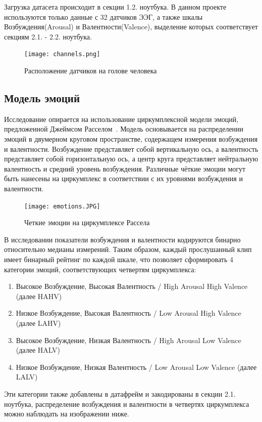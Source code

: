 \documentclass{article}
\begin{document}
Загрузка датасета происходит в секции 1.2. ноутбука. В данном проекте используются только данные с 32 датчиков ЭЭГ, а также шкалы Возбуждения(Arousal) и Валентности(Valence), выделение которых соответствует секциям 2.1. - 2.2. ноутбука.

\begin{figure}[h!]
\centering
\texttt{[image: channels.png]}
\caption{Расположение датчиков на голове человека}
\end{figure}

\subsection{Модель эмоций}
Исследование опирается на использование циркумплексной модели эмоций, предложенной Джеймсом Расселом~\cite{Russell}. Модель основывается на распределении эмоций в двумерном круговом пространстве, содержащем измерения возбуждения и валентности. Возбуждение представляет собой вертикальную ось, а валентность представляет собой горизонтальную ось, а центр круга представляет нейтральную валентность и средний уровень возбуждения. Различные чёткие эмоции могут быть нанесены на циркумплекс в соответствии с их уровнями возбуждения и валентности.

\begin{figure}[h!]
\centering
\texttt{[image: emotions.JPG]}
\caption{Четкие эмоции на циркумплексе Рассела~\cite{balanzo}}
\end{figure}

В исследовании показатели возбуждения и валентности кодируются бинарно относительно медианы измерений. Таким образом, каждый прослушанный клип имеет бинарный рейтинг по каждой шкале, что позволяет сформировать 4 категории эмоций, соответствующих четвертям циркумплекса:
\begin{enumerate}
    \item Высокое Возбуждение, Высокая Валентность / High Arousal High Valence (далее HAHV)
    \item Низкое Возбуждение, Высокая Валентность / Low Arousal High Valence (далее LAHV)
    \item Высокое Возбуждение, Низкая Валентность / High Arousal Low Valence (далее HALV)
    \item Низкое Возбуждение, Низкая Валентность / Low Arousal Low Valence (далее LALV)
\end{enumerate}
Эти категории также добавлены в датафрейм и закодированы в секции 2.1. ноутбука, распределение возбуждения и валентности в четвертях циркумплекса можно наблюдать на изображении ниже.
\end{document}
